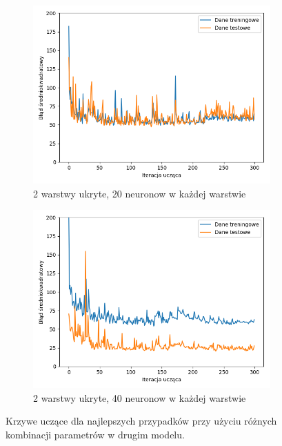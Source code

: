 \documentclass[12pt]{aghdpl}
\begin{document}
\begin{figure}[h]
		 	\begin{subfigure}{.5\linewidth}
		 		\includegraphics[width =\linewidth]{wykresy/4_zwiekszenie_stopnia_skomplikowania_modelu/2_warstwy_20_neuronow_wykres_uczenia.png}
		 		\caption{2 warstwy ukryte, 20 neuronow w każdej warstwie}
		 	\end{subfigure}
		 	\begin{subfigure}{.5\linewidth}
		 		\includegraphics[width =\linewidth]{wykresy/4_zwiekszenie_stopnia_skomplikowania_modelu/2_warstwy_40_neuronow_wykres_uczenia.png}
		 		\caption{2 warstwy ukryte, 40 neuronow w każdej warstwie}
		 	\end{subfigure}
	 	
 			\caption{Krzywe uczące dla najlepszych przypadków przy użyciu różnych kombinacji parametrów w drugim modelu.}
			\label{fig: drugi_model_kombinacje_parametrow_wykresy_uczenia}
		\end{figure}
		
\end{document}
